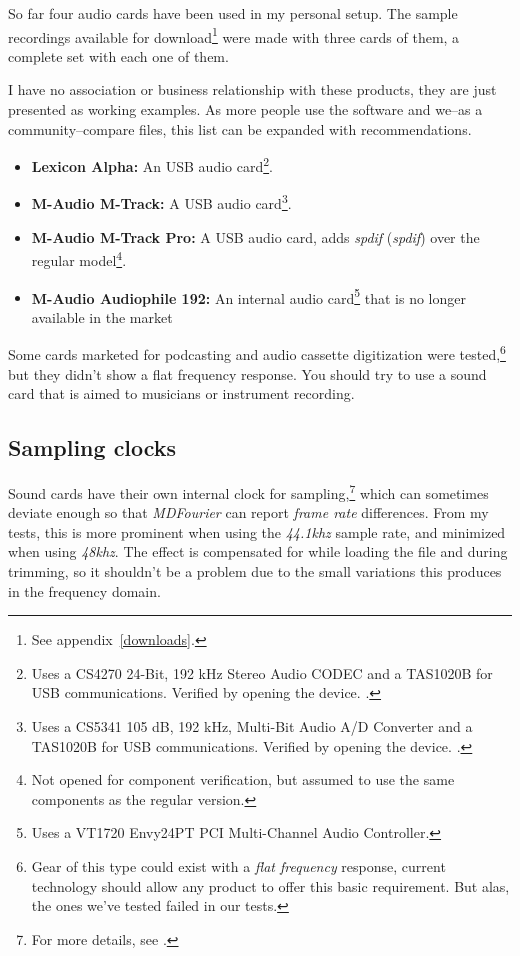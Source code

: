 \documentclass[10pt,a4paper]{report}
\newcommand{\define}[1]{\textit{\acrlong{#1}} (\textit{\acrshort{#1}})}
\newcommand{\khz}[1]{\textit{\mbox{#1\acrshort{khz}}}}
\begin{document}
\begin{appendices}
So far four audio cards have been used in my personal setup. The sample recordings available for download\footnote{See appendix~\ref{downloads}.} were made with three cards of them, a complete set with each one of them.

I have no association or business relationship with these products, they are just presented as  working examples. As more people use the software and we--as a community--compare files, this list can be expanded with recommendations.

\begin{itemize}
	\item \textbf{Lexicon Alpha:} An USB audio card\footnote{Uses a CS4270 24-Bit, 192 kHz Stereo Audio CODEC and a TAS1020B for USB communications. Verified by opening the device. \cite{lexicon}.}. 
	\item \textbf{M-Audio M-Track:} A USB audio card\footnote{Uses a CS5341  105 dB, 192 kHz, Multi-Bit Audio A/D Converter and a TAS1020B for USB communications. Verified by opening the device. \cite{maudiomtrack}.}. 
	\item \textbf{M-Audio M-Track Pro:} A USB audio card, adds \define{spdif} over the regular model\footnote{Not opened for component verification, but assumed to use the same components as the regular version.}. \cite{maudiomtrack}
	\item \textbf{M-Audio Audiophile 192:} An internal audio card\footnote{Uses a VT1720 Envy24PT PCI Multi-Channel Audio Controller.} that is no longer available in the market \cite{maudio}
\end{itemize}

Some cards marketed for podcasting and audio cassette digitization were tested,\footnote{Gear of this type could exist with a \textit{flat frequency} response, current technology should allow any product to offer this basic requirement. But alas, the ones we've tested failed in our tests.} but they didn't show a flat frequency response. You should try to use a sound card that is aimed to musicians or instrument recording.

\subsection{Sampling clocks}
\label{samplingclocks}

Sound cards have their own internal clock for sampling,\footnote{For more details, see \cite{SoundCardClock} \cite{soundcardtiming} \cite{gwsoundcardtiming}.} which can sometimes deviate enough so that \textit{MDFourier} can report \textit{frame rate} differences. From my tests, this is more prominent when using the \khz{44.1} sample rate, and minimized when using \khz{48}. The effect is compensated for while loading the file and during trimming, so it shouldn't be a problem  due to the small variations this produces in the frequency domain. 


\end{appendices}
\end{document}
